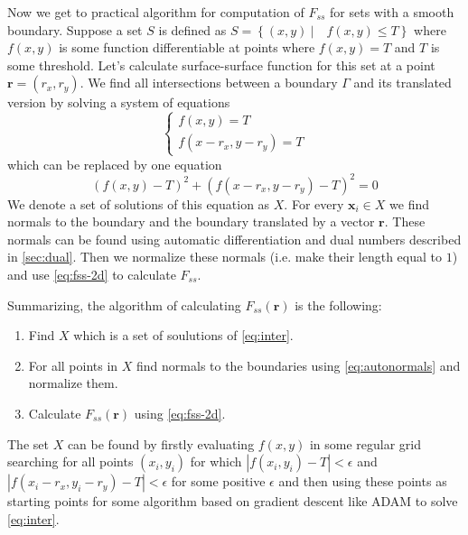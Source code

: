 \documentclass[reprint,amsmath,amssymb,aps,pre,showkeys,showpacs]{revtex4-1}
\begin{document}
Now we get to practical algorithm for computation of $F_{ss}$ for sets with a
smooth boundary. Suppose a set $S$ is defined as
$S = \left\{ (x, y) \ | \quad f(x, y) \le T \right\}$ where $f(x, y)$ is some
function differentiable at points where $f(x, y) = T$ and $T$ is some
threshold. Let's calculate surface-surface function for this set at a point
$\bm{r} = (r_x, r_y)$. We find all intersections between a boundary $\Gamma$ and
its translated version by solving a system of equations
\begin{equation*}
  \left\{
  \begin{array}{l}
    f(x, y) = T \\
    f(x-r_x, y-r_y) = T
  \end{array}
  \right.
\end{equation*}
which can be replaced by one equation
\begin{equation}
  (f(x, y) - T)^2 + (f(x-r_x, y-r_y) - T)^2 = 0 \label{eq:inter}
\end{equation}
We denote a set of solutions of this equation as $X$. For every $\bm{x}_i \in X$
we find normals to the boundary and the boundary translated by a vector
$\bm{r}$. These normals can be found using automatic differentiation and dual
numbers described in \cref{sec:dual}. Then we normalize these normals (i.e. make
their length equal to $1$) and use \cref{eq:fss-2d} to calculate $F_{ss}$.

Summarizing, the algorithm of calculating $F_{ss}(\bm{r})$ is the following:
\begin{enumerate}
\item Find $X$ which is a set of soulutions of \cref{eq:inter}.
\item For all points in $X$ find normals to the boundaries using
  \cref{eq:autonormals} and normalize them.
\item Calculate $F_{ss}(\bm{r})$ using \cref{eq:fss-2d}.
\end{enumerate}

The set $X$ can be found by firstly evaluating $f(x, y)$ in some regular grid
searching for all points $(x_i, y_i)$ for which $|f(x_i, y_i) - T| < \epsilon$
and $|f(x_i - r_x, y_i - r_y) - T| < \epsilon$ for some positive $\epsilon$
and then using these points as starting points for some algorithm based on
gradient descent like ADAM to solve \cref{eq:inter}.
\end{document}
